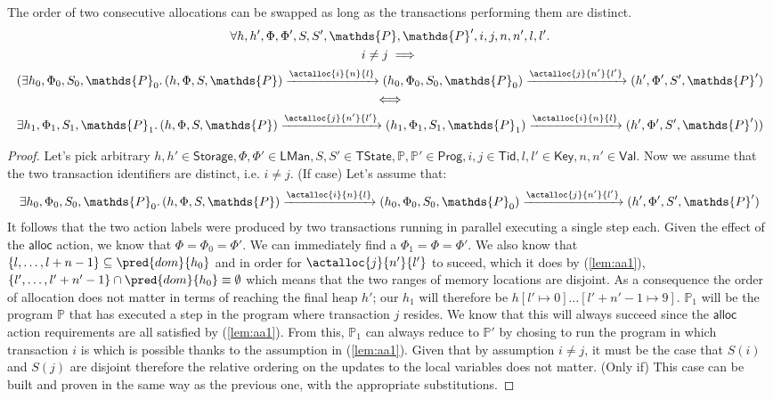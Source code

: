 \lem The order of two consecutive allocations can be swapped as long as the transactions performing them are distinct.
\begin{gather*}
	\forall h, h', \Phi, \Phi', S, S', \mathds{P}, \mathds{P}', i, j, n, n', l, l' \ldotp \\
	i \neq j \implies \\
	(\exists h_0, \Phi_0, S_0, \mathds{P}_0 \ldotp 
	(h, \Phi, S, \mathds{P}) \xrightarrow{\actalloc{i}{n}{l}} (h_0, \Phi_0, S_0, \mathds{P}_0)  \xrightarrow{\actalloc{j}{n'}{l'}} (h', \Phi', S', \mathds{P}') \\
	\iff \\
	\exists h_1, \Phi_1, S_1, \mathds{P}_1 \ldotp
	(h, \Phi, S, \mathds{P}) \xrightarrow{\actalloc{j}{n'}{l'}} (h_1, \Phi_1, S_1, \mathds{P}_1) \xrightarrow{\actalloc{i}{n}{l}} (h', \Phi', S', \mathds{P}'))
\end{gather*}
\begin{proof}
Let's pick arbitrary $h, h' \in \mathsf{Storage}, \Phi, \Phi' \in \mathsf{LMan}, S, S' \in \mathsf{TState}, \mathds{P}, \mathds{P}' \in \mathsf{Prog}, i, j \in \mathsf{Tid}, l, l' \in \mathsf{Key}, n, n' \in \mathsf{Val}$. Now we assume that the two transaction identifiers are distinct, i.e. $i \neq j$. (If case) Let's assume that:
\begin{gather} \label{lem:aa1}
	\exists h_0, \Phi_0, S_0, \mathds{P}_0 \ldotp 
	(h, \Phi, S, \mathds{P}) \xrightarrow{\actalloc{i}{n}{l}} (h_0, \Phi_0, S_0, \mathds{P}_0)  \xrightarrow{\actalloc{j}{n'}{l'}} (h', \Phi', S', \mathds{P}')
\end{gather}
It follows that the two action labels were produced by two transactions running in parallel executing a single step each. Given the effect of the $\mathsf{alloc}$ action, we know that $\Phi = \Phi_0 = \Phi'$. We can immediately find a $\Phi_1 = \Phi = \Phi'$. We also know that $\{l, \ldots, l + n - 1\} \subseteq \pred{dom}{h_0}$ and in order for $\actalloc{j}{n'}{l'}$ to suceed, which it does by (\ref{lem:aa1}), $\{l', \ldots, l' + n' - 1\} \cap \pred{dom}{h_0} \equiv \emptyset$ which means that the two ranges of memory locations are disjoint. As a consequence the order of allocation does not matter in terms of reaching the final heap $h'$; our $h_1$ will therefore be $h[l' \mapsto 0]\ldots[l' + n' - 1 \mapsto 9]$. $\mathds{P}_1$ will be the program $\mathds{P}$ that has executed a step in the program where transaction $j$ resides. We know that this will always succeed since the $\mathsf{alloc}$ action requirements are all satisfied by (\ref{lem:aa1}). From this, $\mathds{P}_1$ can always reduce to $\mathds{P}'$ by chosing to run the program in which transaction $i$ is which is possible thanks to the assumption in (\ref{lem:aa1}). Given that by assumption $i \neq j$, it must be the case that $S(i)$ and $S(j)$ are disjoint therefore the relative ordering on the updates to the local variables does not matter. (Only if) This case can be built and proven in the same way as the previous one, with the appropriate substitutions.
\end{proof}

